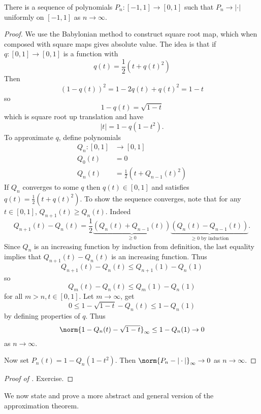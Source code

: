 \documentclass[a4paper]{article}
\begin{document}
\begin{lemma}
  \label{lem:approximation of absolute value}
  There is a sequence of polynomials \(P_n: [-1, 1] \to [0, 1]\) such that \(P_n \to |\cdot|\) uniformly on \([-1, 1]\) as \(n \to \infty\).
\end{lemma}

\begin{proof}
  We use the Babylonian method to construct square root map, which when composed with square maps gives absolute value. The idea is that if \(q: [0, 1] \to [0, 1]\) is a function with
  \[
    q(t) = \frac{1}{2}(t + q(t)^2)
  \]
  Then
  \[
    (1 - q(t))^2 = 1 - 2q(t)+ q(t)^2 = 1 - t
  \]
  so
  \[
    1 - q(t) = \sqrt{1 - t}
  \]
  which is square root up translation and have
  \[
    |t| = 1 - q(1 - t^2).
  \]
  To approximate \(q\), define polynomials
  \begin{align*}
    Q_n: [0, 1] &\to [0, 1] \\
    Q_0(t) &= 0 \\
    Q_n(t) &= \frac{1}{2}(t + Q_{n - 1}(t)^2)
  \end{align*}
  If \(Q_n\) converges to some \(q\) then \(q(t) \in [0, 1]\) and satisfies \(q(t) = \frac{1}{2}(t + q(t)^2)\). To show the sequence converges, note that for any \(t \in [0, 1]\), \(Q_{n + 1}(t) \geq Q_n(t)\). Indeed
  \[
    Q_{n + 1}(t) - Q_n(t) = \frac{1}{2} \underbrace{(Q_n(t) + Q_{n - 1}(t))}_{\geq 0} \underbrace{(Q_n(t) - Q_{n - 1}(t))}_{\geq 0 \text{ by induction}}.
  \]
  Since \(Q_n\) is an increasing function by induction from definition, the last equality implies that \(Q_{n + 1}(t) - Q_n(t)\) is an increasing function. Thus
  \[
    Q_{n + 1}(t) - Q_n(t) \leq Q_{n + 1}(1) - Q_n(1)
  \]
  so
  \[
    Q_m(t) - Q_n(t) \leq Q_m(1) - Q_n(1)
  \]
  for all \(m > n, t \in [0, 1]\). Let \(m \to \infty\), get
  \[
    0 \leq 1 - \sqrt{1 - t} - Q_n(t) \leq 1 - Q_n(1)
  \]
  by defining properties of \(q\). Thus
  \[
    \norm{1 - Q_n(t) - \sqrt{1 - t}}_\infty \leq 1 - Q_n(1) \to 0
  \]
  as \(n \to \infty\).

  Now set \(P_n(t) = 1 - Q_n(1 - t^2)\). Then \(\norm{P_n - |\cdot|}_\infty \to 0\) as \(n \to \infty\).
\end{proof}

\begin{proof}[Proof of ]
  Exercise.
\end{proof}

We now state and prove a more abstract and general version of the approximation theorem.
\end{document}
